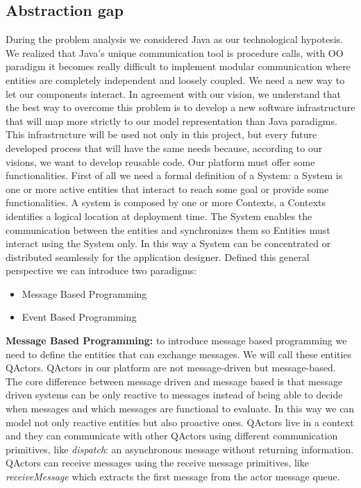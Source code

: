 \subsection{Abstraction gap}
During the problem analysis we considered Java as our technological hypotesis.
We realized that Java’s unique communication tool is procedure calls, with
OO paradigm it becomes really difficult to implement modular communication
where entities are completely independent and loosely coupled. We need a new
way to let our components interact. In agreement with our vision, we understand
that the best way to overcome this problem is to develop a new software
infrastructure that will map more strictly to our model representation than Java
paradigms. This infrastructure will be used not only in this project, but every
future developed process that will have the same needs because, according to
our visions, we want to develop reusable code.
Our platform must offer some functionalities. First of all we need a formal definition
of a System:
a System is one or more active entities that interact to reach some goal or provide
some functionalities. A system is composed by one or more Contexts, a Contexts
identifies a logical location at deployment time. The System enables the communication
between the entities and synchronizes them so Entities must interact
using the System only. In this way a System can be concentrated or distributed
seamlessly for the application designer. Defined this general perspective we can
introduce two paradigms:
\begin{itemize}
	\item Message Based Programming
	\item Event Based Programming
\end{itemize}
\textbf{Message Based Programming:} to introduce message based programming we
need to define the entities that can exchange messages. We will call these entities
QActors.
QActors in our platform are not message-driven but message-based. The core
difference between message driven and message based is that message driven
systems can be only reactive to messages instead of being able to decide when
messages and which messages are functional to evaluate. In this way we can
model not only reactive entities but also proactive ones. QActors live in a context
and they can communicate with other QActors using different communication
primitives, like \textit{dispatch}: an asynchronous message without returning information. \\
QActors can receive messages using the receive message primitives, like \textit{receiveMessage} which extracts the first message from the actor message queue. \\\\
